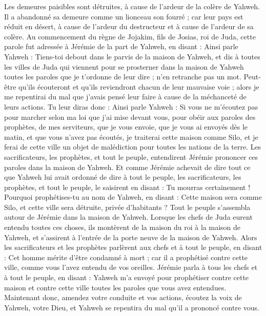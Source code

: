 \begin{multicols}{2}
Les demeures paisibles sont détruites, à cause de l'ardeur de la colère de Yahweh.
Il a abandonné sa demeure comme un lionceau son fourré ; car leur pays est réduit en désert, à cause de l'ardeur du destructeur et à cause de l'ardeur de sa colère.
\VerseOne{}Au commencement du règne de Jojakim, fils de Josias, roi de Juda, cette parole fut adressée à Jérémie de la part de Yahweh, en disant :
Ainsi parle Yahweh : Tiens-toi debout dans le parvis de la maison de Yahweh, et dis à toutes les villes de Juda qui viennent pour se prosterner dans la maison de Yahweh toutes les paroles que je t'ordonne de leur dire ; n'en retranche pas un mot.
Peut-être qu'ils écouteront et qu'ils reviendront chacun de leur mauvaise voie ; alors je me repentirai du mal que j’avais pensé leur faire à cause de la méchanceté de leurs actions.
Tu leur diras donc : Ainsi parle Yahweh : Si vous ne m'écoutez pas pour marcher selon ma loi que j’ai mise devant vous,
pour obéir aux paroles des prophètes, de mes serviteurs, que je vous envoie, que je vous ai envoyés dès le matin, et que vous n'avez pas écoutés,
je traiterai cette maison comme Silo, et je ferai de cette ville un objet de malédiction pour toutes les nations de la terre.
Les sacrificateurs, les prophètes, et tout le peuple, entendirent Jérémie prononcer ces paroles dans la maison de Yahweh.
Et comme Jérémie achevait de dire tout ce que Yahweh lui avait ordonné de dire à tout le peuple, les sacrificateurs, les prophètes, et tout le peuple, le saisirent en disant : Tu mourras certainement !
Pourquoi prophétises-tu au nom de Yahweh, en disant : Cette maison sera comme Silo, et cette ville sera détruite, privée d’habitants ? Tout le peuple s'assembla autour de Jérémie dans la maison de Yahweh.
Lorsque les chefs de Juda eurent entendu toutes ces choses, ils montèrent de la maison du roi à la maison de Yahweh, et s'assirent à l'entrée de la porte neuve de la maison de Yahweh.
Alors les sacrificateurs et les prophètes parlèrent aux chefs et à tout le peuple, en disant : Cet homme mérite d'être condamné à mort ; car il a prophétisé contre cette ville, comme vous l'avez entendu de vos oreilles.
Jérémie parla à tous les chefs et à tout le peuple, en disant : Yahweh m'a envoyé pour prophétiser contre cette maison et contre cette ville toutes les paroles que vous avez entendues.
Maintenant donc, amendez votre conduite et vos actions, écoutez la voix de Yahweh, votre Dieu, et Yahweh se repentira du mal qu'il a prononcé contre vous.

\end{multicols}
